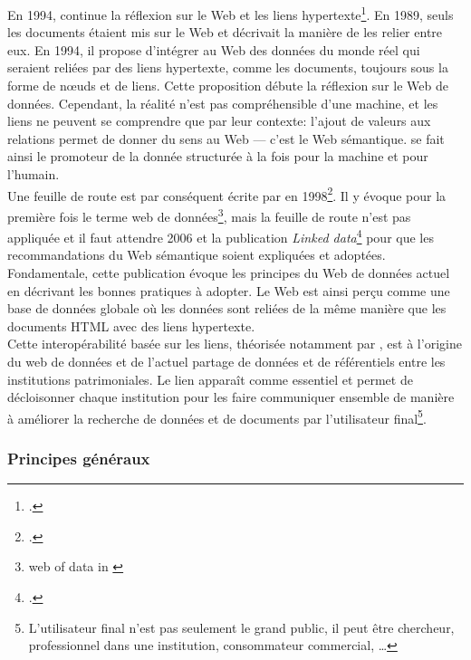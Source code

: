 En 1994,  continue la réflexion sur le Web et les liens hypertexte\footcite{berners-lee_plenary_1994}. En 1989, seuls les documents étaient mis sur le Web et  décrivait la manière de les relier entre eux. En 1994, il propose d'intégrer au Web des données du monde réel qui seraient reliées par des liens hypertexte, comme les documents, toujours sous la forme de nœuds et de liens. Cette proposition débute la réflexion sur le Web de données. Cependant, la réalité n'est pas compréhensible d'une machine, et les liens ne peuvent se comprendre que par leur contexte: l'ajout de valeurs aux relations permet de donner du sens au Web --- c'est le Web sémantique.  se fait ainsi le promoteur de la donnée structurée à la fois pour la machine et pour l'humain.\\

Une feuille de route est par conséquent écrite par  en 1998\footcite{berners-lee_semantic_1998}. Il y évoque pour la première fois le terme \og web de données\fg{}\footnote{\og web of data\fg{} in \cite{berners-lee_semantic_1998}}, mais la feuille de route n'est pas appliquée et il faut attendre 2006 et la publication \textit{Linked data}\footcite{berners-lee_linked_2006} pour que les recommandations du Web sémantique soient expliquées et adoptées. Fondamentale, cette publication évoque les principes du Web de données actuel en décrivant les bonnes pratiques à adopter. Le Web est ainsi perçu comme une \og base de données globale\fg{}\cite[§29]{bermes_2_2013} où les données sont reliées de la même manière que les documents HTML avec des liens hypertexte.\\

Cette interopérabilité basée sur les liens, théorisée notamment par , est à l'origine du web de données et de l'actuel partage de données et de référentiels entre les institutions patrimoniales. Le lien apparaît comme essentiel et permet de décloisonner chaque institution pour les faire communiquer ensemble de manière à améliorer la recherche de données et de documents par l'utilisateur final\footnote{L'utilisateur final n'est pas seulement le grand public, il peut être chercheur, professionnel dans une institution, consommateur commercial, \dots}.

\subsubsection{\label{II-A-1-a-ii}Principes généraux}

